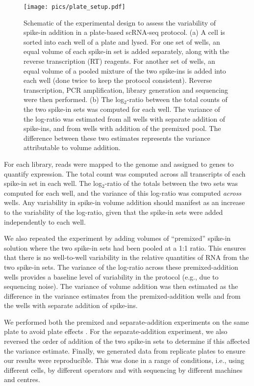 \documentclass{article}
\begin{document}
\begin{figure}[tbp]
\begin{center}
\texttt{[image: pics/plate\_setup.pdf]}
\end{center}
\caption{Schematic of the experimental design to assess the variability of spike-in addition in a plate-based scRNA-seq protocol.
(a) A cell is sorted into each well of a plate and lysed.
For one set of wells, an equal volume of each spike-in set is added separately, along with the reverse transcription (RT) reagents.
For another set of wells, an equal volume of a pooled mixture of the two spike-ins is added into each well (done twice to keep the protocol consistent).
Reverse transcription, PCR amplification, library generation and sequencing were then performed.
(b) The log$_2$-ratio between the total counts of the two spike-in sets was computed for each well.
The variance of the log-ratio was estimated from all wells with separate addition of spike-ins, and from wells with addition of the premixed pool.
The difference between these two estimates represents the variance attributable to volume addition.
}
\label{fig:expdesign}
\end{figure}

For each library, reads were mapped to the genome and assigned to genes to quantify expression.
The total count was computed across all transcripts of each spike-in set in each well.
The log$_2$-ratio of the totals between the two sets was computed for each well, and the variance of this log-ratio was computed \textit{across} wells.
Any variability in spike-in volume addition should manifest as an increase to the variability of the log-ratio, given that the spike-in sets were added independently to each well.

We also repeated the experiment by adding volumes of ``premixed'' spike-in solution where the two spike-in sets had been pooled at a 1:1 ratio.
This ensures that there is no well-to-well variability in the relative quantities of RNA from the two spike-in sets.
The variance of the log-ratio across these premixed-addition wells provides a baseline level of variability in the protocol (e.g., due to sequencing noise).
The variance of volume addition was then estimated as the difference in the variance estimates from the premixed-addition wells and from the wells with separate addition of spike-ins.

We performed both the premixed and separate-addition experiments on the same plate to avoid plate effects \cite{hicks2015widespread,tung2016batch}.
For the separate-addition experiment, we also reversed the order of addition of the two spike-in sets to determine if this affected the variance estimate.
Finally, we generated data from replicate plates to ensure our results were reproducible.
This was done in a range of conditions, i.e., using different cells, by different operators and with sequencing by different machines and centres.
\end{document}
